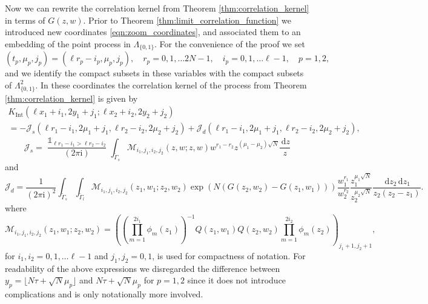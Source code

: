 \documentclass[11pt]{article}
\theoremstyle{plain}
\theoremstyle{definition}
\numberwithin{equation}{section}
\renewcommand{\d}{\,\mathrm{d}}
\renewcommand{\i}{\mathrm{i}}
\DeclareMathOperator{\one}{\mathds{1}}
\begin{document}
Now we can rewrite the correlation kernel from Theorem \ref{thm:correlation_kernel} in terms of $G(z,w)$. Prior to Theorem \ref{thm:limit_correlation_function} we introduced new coordinates \eqref{eqn:zoom_coordinates},
and associated them to an embedding of the point process in $\Lambda_{\{0,1\}}$.
 For the convenience of the proof we set
\begin{equation}\label{eqn:proof_coordinates}
(t_p, \mu_p, j_p)= (\ell r_p-i_p, \mu_p, j_p),\quad r_p=0,1,\ldots 2N-1,\quad i_p=0,1,\ldots \ell-1,\quad p=1,2,
\end{equation}
%
%
and we identify the compact subsets in these variables with the compact subsets of $\Lambda_{\{0,1\}}^2$.
In these coordinates
%
%
the correlation kernel of the process from Theorem \ref{thm:correlation_kernel} is given by
\begin{multline} \label{eqn:kerneljdjs}
K_{\operatorname{Int}}(\ell x_1+i_1, 2y_1+j_1; \ell x_2+i_2, 2y_2+j_2 )
\\
=-\mathcal{J}_{s}(\ell r_1- i_1, 2\mu_1+j_1, \ell r_2-i_2, 2\mu_2+j_2)
+\mathcal{J}_{d}(\ell r_1- i_1, 2\mu_1+j_1, \ell r_2-i_2, 2\mu_2+j_2),
\end{multline}
%
\begin{equation} \label{eqn:Js}
\mathcal{J}_{s}=
\frac{\one_{\ell r_1-i_1>\ell r_2-i_2}}{(2\pi\i)}\int_{\tilde \Gamma_s}
\boldsymbol{\mathcal{M}}_{i_1,j_1,i_2,j_2}(z,w;z,w) 
w^{r_1-r_2}
z^{(\mu_1-\mu_2)\sqrt{N}}
\frac{\d z}{z}
\end{equation}
and
\begin{equation} \label{eqn:Jd}
\mathcal{J}_{d}=
\frac{1}{(2\pi\i)^2}\int_{\tilde \Gamma_s}\int_{\tilde \Gamma_l}
\boldsymbol{\mathcal{M}}_{i_1,j_1,i_2,j_2}(z_1,w_1;z_2,w_2) 
\exp\left({N(G(z_2,w_2)-G(z_1,w_1))}\right)
\frac{w_1^{r_1}}{w_2^{r_2}}
 \frac{z_1^{\mu_1\sqrt{N}}}{z_2^{\mu_2\sqrt{N}}}
 \frac{\d z_2\d z_1}{z_2(z_2-z_1)}.
\end{equation}
where
\begin{equation}\label{eqn:matrix_part_integrand}
\boldsymbol{\mathcal{M}}_{i_1,j_1,i_2,j_2}\left(z_1,w_1;z_2,w_2\right) =\left(\left(\prod_{m=1}^{2i_1}\phi_m(z_1)\right)^{-1}Q(z_1,w_1)Q(z_2,w_2)\prod_{m=1}^{2i_2}\phi_m(z_2)\right)_{j_1+1,j_2+1},
\end{equation}
for $i_1, i_2=0,1,\ldots \ell-1$ and $j_1, j_2=0, 1$, is used for compactness of notation. For readability of the above expressions we disregarded the difference between $y_p=\lfloor N\tau +\sqrt{N}\mu_p\rfloor$ and $N\tau +\sqrt{N}\mu_p$ for $p=1,2$ since it does not introduce complications and is only notationally more involved.
\end{document}
